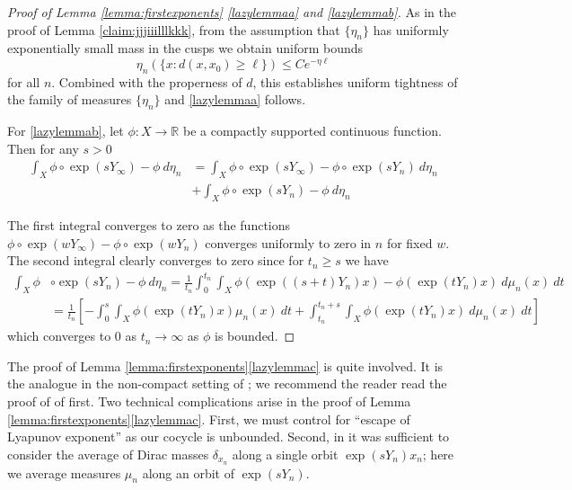 \documentclass[10pt,reqno]{amsart}
\theoremstyle{Theorem}
\theoremstyle{definition}
\theoremstyle{remark}
\newcommand{\note}[1]{\marginpar{{\color{red}\footnotesize \begin{spacing}{1}#1\end{spacing}}}}
\newcommand{\R}{\mathbb {R}}
\begin{document}
\begin{proof}[Proof of Lemma \ref{lemma:firstexponents} \ref{lazylemmaa} and  \ref{lazylemmab}]
As in the proof of Lemma \ref{claim:jjjiiilllkkk}, from the assumption that $\{\eta_n\}$ has uniformly exponentially small mass in the cusps we obtain uniform bounds $$\eta_n (\{x: d(x,x_0) \ge \ell\})\le C e^{-\eta \ell}$$ for all $n$.  Combined with the properness of $d$, this establishes uniform tightness of the family of  measures $\{\eta_n\}$ and  \ref{lazylemmaa} follows.

For  \ref{lazylemmab},    let  $\phi \colon X \to \R$ be a compactly supported  continuous function.  Then for any $s>0$
\begin{align*}
\int_{X} \phi \circ \exp (sY_\infty) -  \phi \ d \eta_n
&= \int_{X} \phi \circ \exp (sY_\infty)  -  \phi \circ \exp(s Y_n) \ d\eta_n\\
&+ \int_{X}  \phi \circ \exp(sY_n) - \phi \ d\eta_n
\end{align*}

\noindent The first integral converges to zero as the functions $\phi \circ \exp (wY_\infty)  -  \phi \circ \exp(w Y_n)$ converges uniformly to zero in $n$ for fixed $w$.  The second integral clearly converges to zero  since for $t_n\ge s$ we have
\begin{align*}
\int_{X}  \phi &\circ \exp(s Y_n) - \phi \ d\eta_n=
\frac{1}{t_n} \int_0^{t_n} \int_X \phi \left( \exp\left((s+t) Y_n\right)  x \right) - \phi \left(\exp (tY_n) x \right) \ d \mu_n(x) \ d t\\
&=
\frac{1}{t_n}\left[ - \int_0^{s} \int _X\phi \left( \exp\left(t Y_n\right)  x \right) \mu_n(x) \ d t + \int_{t_n}^{t_n+s}  \int_X \phi \left( \exp\left(t Y_n\right)  x \right) \ d \mu_n(x) \ d t\right]
\end{align*}
which converges to 0 as $t_n\to \infty$ as $\phi$ is bounded.
\end{proof}



The proof of Lemma \ref{lemma:firstexponents}\ref{lazylemmac} is quite involved. It is the analogue in the non-compact
setting of \cite[Lemma 3.6]{BFH};  we recommend the reader read the proof of of \cite[Lemma 3.6]{BFH} first.  Two technical
complications arise in the proof of Lemma \ref{lemma:firstexponents}\ref{lazylemmac}.
 First, we must control for ``escape of Lyapunov exponent'' as our cocycle is unbounded.    Second, in \cite{BFH} it was sufficient to  consider the average  of Dirac masses $\delta_{x_n}$ along a single orbit $\exp(sY_n)x_n$; here we average measures $\mu_n$  along an  orbit of $\exp (sY_n).$
\end{document}
